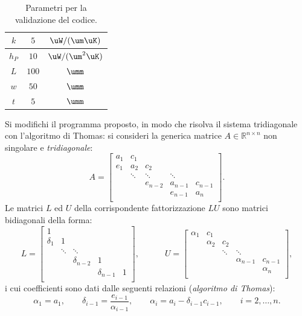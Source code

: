 \begin{table}
\centering
\begin{tabular}{|c|c|c|}
\hline
$k$     & $5$   & $\uW / (\um\uK)$ \\
\hline
$h_P$   & $10$  & $\uW / (\um^2\uK)$ \\
\hline
$L$     & $100$ & $\umm$ \\
\hline
$w$     & $50$  &  $\umm$ \\
\hline
$t$     & $5$   & $\umm$ \\
\hline
\end{tabular}
\caption{Parametri per la validazione del codice.}
\label{tab:parameters}
\end{table}

Si modifichi il programma proposto, in modo che risolva il sistema tridiagonale
con l'algoritmo di Thomas: si consideri la generica matrice $A \in \mathbb R^{n
\times n}$ non singolare e {\it tridiagonale}:
      \[
       A = \left [ \begin{array}{ccccc}
                  a_1 & c_1 & & & \\
                    e_1  & a_2 & c_2 &  & \\
                    & \ddots& \ddots & \ddots & \\
                     & & e_{n-2}& a_{n-1} & c_{n-1} \\
                    & &  & e_{n-1} & a_n \\ 
                  \end{array}
           \right ] .        
      \]
      Le matrici $L$ ed $U$ della corrispondente fattorizzazione 
      $LU$ sono matrici bidiagonali della forma:
      \[
      L = \left [ \begin{array}{ccccc}
                  1 & & & & \\
                  \delta_{1}& 1 & & & \\
                    & \ddots & \ddots & & \\
                    & & \delta_{n-2} & 1 & \\
                    & & & \delta_{n-1} & 1 \\ 
                  \end{array}
           \right ],               
       \qquad      \quad
        U = \left [ \begin{array}{ccccc}
                  \alpha_1 & c_1 & & & \\
                      & \alpha_2 & c_2 &  & \\
                    & & \ddots & \ddots & \\
                     & & & \alpha_{n-1} & c_{n-1} \\
                    & &  &  & \alpha_n \\ 
                  \end{array}
           \right ] ,        
      \]
      i cui coefficienti sono dati dalle seguenti relazioni 
      (\emph{algoritmo di Thomas}):
      \[
       \alpha_1=a_1,\qquad \delta_{i-1}=\frac{e_{i-1}}{\alpha_{i-1}}, 
         \qquad \alpha_i=a_i-\delta_{i-1} c_{i-1}, \qquad i=2,\ldots,n.
       \]

